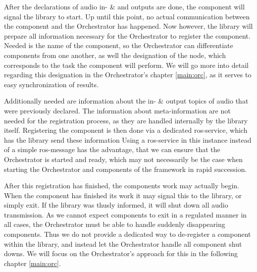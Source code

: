 After the declarations of audio in- \& and outputs are done, the component will signal the library to start.
Up until this point, no actual communication between the component and the Orchestrator has happened.
Now however, the library will prepare all information necessary for the Orchestrator to register the component.
Needed is the name of the component, so the Orchestrator can differentiate components from one another, as well the designation of the node, which corresponds to the task the component will perform.
We will go more into detail regarding this designation in the Orchestrator's chapter \ref{main:orc}, as it serves to easy synchronization of results.

Additionally needed are information about the in- \& output topics of audio that were previously declared.
The information about meta-information are not needed for the registration process, as they are handled internally by the library itself.
Registering the component is then done via a dedicated \gls{ros}-service, which has the library send these information
Using a \gls{ros}-service in this instance instead of a simple \gls{ros}-message has the advantage, that we can ensure that the Orchestrator is started and ready, which may not necessarily be the case when starting the Orchestrator and components of the framework in rapid succession.

After this registration has finished, the components work may actually begin.
When the component has finished its work it may signal this to the library, or simply exit.
If the library was thusly informed, it will shut down all audio transmission.
As we cannot expect components to exit in a regulated manner in all cases, the Orchestrator must be able to handle suddenly disappearing components.
Thus we do not provide a dedicated way to de-register a component within the library, and instead let the Orchestrator handle all component shut downs.
We will focus on the Orchestrator's approach for this in the following chapter \ref{main:orc}.
